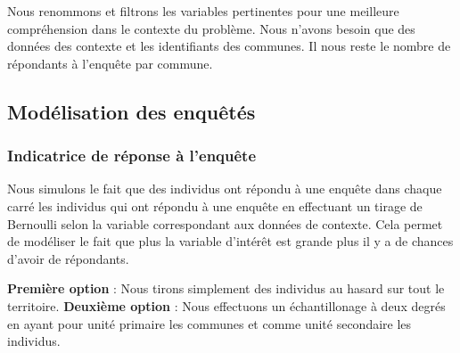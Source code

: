 \documentclass[
]{article}
\newenvironment{Shaded}{\begin{snugshade}}{\end{snugshade}}
\newcommand{\AttributeTok}[1]{\textcolor[rgb]{0.77,0.63,0.00}{#1}}
\newcommand{\CommentTok}[1]{\textcolor[rgb]{0.56,0.35,0.01}{\textit{#1}}}
\newcommand{\FunctionTok}[1]{\textcolor[rgb]{0.00,0.00,0.00}{#1}}
\newcommand{\NormalTok}[1]{#1}
\newcommand{\OtherTok}[1]{\textcolor[rgb]{0.56,0.35,0.01}{#1}}
\newcommand{\SpecialCharTok}[1]{\textcolor[rgb]{0.00,0.00,0.00}{#1}}
\newcommand{\StringTok}[1]{\textcolor[rgb]{0.31,0.60,0.02}{#1}}
\begin{document}
Nous renommons et filtrons les variables pertinentes pour une meilleure
compréhension dans le contexte du problème. Nous n'avons besoin que des
données des contexte et les identifiants des communes. Il nous reste le
nombre de répondants à l'enquête par commune.

\begin{Shaded}
\end{Shaded}

\hypertarget{moduxe9lisation-des-enquuxeatuxe9s}{%
\subsection{Modélisation des
enquêtés}\label{moduxe9lisation-des-enquuxeatuxe9s}}

\hypertarget{indicatrice-de-ruxe9ponse-uxe0-lenquuxeate}{%
\subsubsection{Indicatrice de réponse à
l'enquête}\label{indicatrice-de-ruxe9ponse-uxe0-lenquuxeate}}

Nous simulons le fait que des individus ont répondu à une enquête dans
chaque carré les individus qui ont répondu à une enquête en effectuant
un tirage de Bernoulli selon la variable correspondant aux données de
contexte. Cela permet de modéliser le fait que plus la variable
d'intérêt est grande plus il y a de chances d'avoir de répondants.

\textbf{Première option} : Nous tirons simplement des individus au
hasard sur tout le territoire. \textbf{Deuxième option} : Nous
effectuons un échantillonage à deux degrés en ayant pour unité primaire
les communes et comme unité secondaire les individus.
\end{document}
